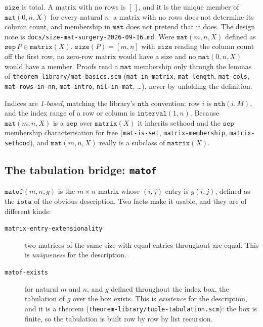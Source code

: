 \noindent
$\mathtt{size}$ is total.  A matrix with no rows is $[\,]$, and it is
the unique member of $\mathtt{mat}(0, n, X)$ for every natural $n$: a
matrix with no rows does not determine its column count, and membership
in $\mathtt{mat}$ does not pretend that it does.  The design note is
\texttt{docs/size-mat-surgery-2026-09-16.md}.
Were $\mathtt{mat}(m,n,X)$ defined as $\mathtt{sep}\, P \in
\mathtt{matrix}(X).\; \mathtt{size}(P) = [m,n]$ with $\mathtt{size}$
reading the column count off the first row, no zero-row matrix would
have a size and no $\mathtt{mat}(0,n,X)$ would have a member.  Proofs read a
$\mathtt{mat}$ membership only through the lemmas of
\texttt{theorem-library/mat-basics.scm} (\texttt{mat-in-matrix},
\texttt{mat-length}, \texttt{mat-cols}, \texttt{mat-rows-in-nn},
\texttt{mat-intro}, \texttt{nil-in-mat}, \ldots), never by unfolding the
definition.

Indices are \emph{1-based}, matching the library's $\mathtt{nth}$
convention: row $i$ is $\mathtt{nth}(i, M)$, and the index range of a
row or column is $\mathtt{interval}(1, n)$.  Because
$\mathtt{mat}(m,n,X)$ is a $\mathtt{sep}$ over $\mathtt{matrix}(X)$ it
inherits sethood and the $\mathtt{sep}$ membership characterisation for
free (\texttt{mat-is-set}, \texttt{matrix-membership},
\texttt{matrix-sethood}), and $\mathtt{mat}(m,n,X)$ really is a subclass
of $\mathtt{matrix}(X)$.

\subsection{The tabulation bridge: \texttt{matof}}

$\mathtt{matof}(m, n, g)$ is the $m \times n$ matrix whose $(i,j)$ entry
is $g(i,j)$, defined as the $\mathtt{iota}$ of the obvious description.
Two facts make it usable, and they are of different kinds:

\begin{description}
\item[\texttt{matrix-entry-extensionality}]
  two matrices of the same size with equal entries throughout are equal.
  This is \emph{uniqueness} for the description.

\item[\texttt{matof-exists}]
  for natural $m$ and $n$, and $g$ defined throughout the index box, the
  tabulation of $g$ over the box exists.  This is \emph{existence} for
  the description, and it is a theorem
  (\texttt{theorem-library/tuple-tabulation.scm}): the box is finite, so
  the tabulation is built row by row by list recursion.
\end{description}

